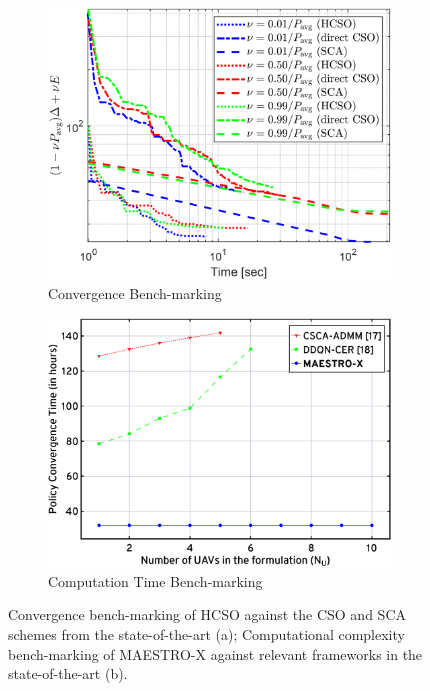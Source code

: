 \documentclass[12pt, draftcls, onecolumn]{IEEEtran}
\theoremstyle{plain}
\theoremstyle{definition}
\theoremstyle{remark}
\begin{document}
\begin{figure}[t]
	\begin{subfigure}{0.49\textwidth}
		\centering
		\includegraphics[width=0.815\linewidth]{figs/Convergence.png}
		\caption{Convergence Bench-marking}
		\label{F5}
	\end{subfigure}
	\begin{subfigure}{0.49\textwidth}
  		\centering
  		\includegraphics[width=0.9\linewidth]{figs/Complexity.png}
  		\caption{Computation Time Bench-marking}
  		\label{F6}
	\end{subfigure}
	\caption{Convergence bench-marking of HCSO against the CSO and SCA schemes from the state-of-the-art (a); Computational complexity bench-marking of MAESTRO-X against relevant frameworks in the state-of-the-art (b).}
	\vspace{-8mm}
	\label{fig:F5andF6}
\end{figure}
\end{document}
